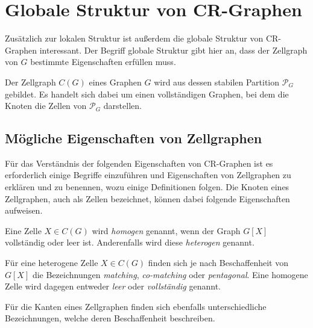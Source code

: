 \section{Globale Struktur von CR-Graphen}
\label{sec/struktur_global}


Zusätzlich zur lokalen Struktur ist außerdem die globale Struktur von CR-Graphen interessant.
Der Begriff globale Struktur gibt hier an, dass der Zellgraph von $G$ bestimmte Eigenschaften erfüllen muss.

\begin{Definition}
	Der Zellgraph $C(G)$ eines Graphen $G$ wird aus dessen stabilen Partition $\mathcal{P}_G$ gebildet.
	Es handelt sich dabei um einen vollständigen Graphen, bei dem die Knoten die Zellen von $\mathcal{P}_G$ darstellen.
\end{Definition}

\subsection{Mögliche Eigenschaften von Zellgraphen}
Für das Verständnis der folgenden Eigenschaften von CR-Graphen ist es erforderlich einige Begriffe einzuführen und Eigenschaften von Zellgraphen zu erklären und zu benennen, wozu einige Definitionen folgen.
Die Knoten eines Zellgraphen, auch als Zellen bezeichnet, können dabei folgende Eigenschaften aufweisen.

\begin{Definition}
	Eine Zelle $X\in C(G)$ wird \emph{homogen} genannt, wenn der Graph $G[X]$ vollständig oder leer ist. Anderenfalls wird diese \emph{heterogen} genannt.
\end{Definition}

\begin{Definition}
	Für eine heterogene Zelle $X\in C(G)$ finden sich je nach Beschaffenheit von $G[X]$ die Bezeichnungen \emph{matching}, \emph{co-matching} oder \emph{pentagonal}.
	Eine homogene Zelle wird dagegen entweder \emph{leer} oder \emph{vollständig} genannt.
\end{Definition}

Für die Kanten eines Zellgraphen finden sich ebenfalls unterschiedliche Bezeichnungen, welche deren Beschaffenheit beschreiben.

